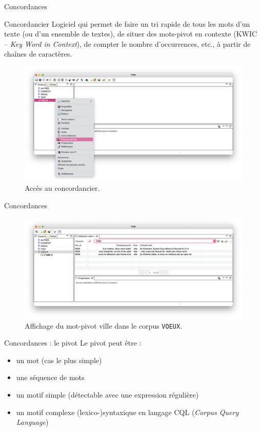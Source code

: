 \documentclass[xetex,xcolor={table,usenames,dvipsnames}]{beamer}
\begin{document}
\begin{frame}{Concordances}
	\begin{block}{Concordancier}
		\justifying
		Logiciel qui permet de faire un tri rapide de tous les mots d'un texte (ou d'un ensemble de textes), de situer des mots-pivot en contexte (\textsc{KWIC} – \textit{Key Word in Context}), de compter le nombre d'occurrences, etc., à partir de chaînes de caractères.
	\end{block}
	\begin{figure}[h] %
		\centering
		\includegraphics[width=0.80\linewidth]{img/concordances.png}
		\caption{Accès au concordancier.}
		\label{fig:ling_out_TAL}
	\end{figure}
\end{frame}

\begin{frame}{Concordances}
		\begin{figure}[h] %
		\centering
		\includegraphics[width=1\linewidth]{img/ville.png}
		\caption{Affichage du mot-pivot \og{}ville\fg{} dans le corpus \texttt{VOEUX}.}
		\label{fig:ling_out_TAL}
	\end{figure}
\end{frame}

\begin{frame}{Concordances : le pivot}
Le pivot peut être :
\begin{itemize}
	\item un mot (cas le plus simple)
	\item une séquence de mots
	\item un motif simple (détectable avec une expression régulière)
	\item un motif complexe (lexico-)syntaxique en langage \textsc{CQL} (\textit{Corpus Query Language})
\end{itemize}

\end{frame}
\end{document}
